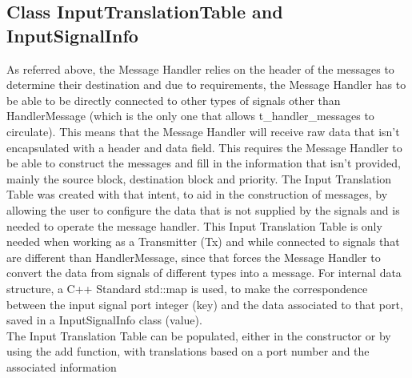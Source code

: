 \begin{refsection}
\subsection{Class InputTranslationTable and InputSignalInfo}
\label{lib:inputtranslationtable}
As referred above, the Message Handler relies on the header of the messages to 
determine their destination and due to requirements, the Message 
Handler has to be able to be directly connected to other types of signals other than 
HandlerMessage (which is the only one that allows t\_handler\_messages to circulate). 
This means that the Message Handler will receive raw data that isn't 
encapsulated with a header and data field. This requires the Message Handler to be 
able to construct the messages and fill in the information that isn't provided, mainly
the source block, destination block and priority. The Input Translation Table  was created
with that intent, to aid in the construction of messages, by 
allowing the user to configure the data that is not supplied by the signals and is 
needed to operate the message handler.
This Input Translation Table is only needed when working as a Transmitter (Tx) and 
while connected to signals that are different than HandlerMessage, since that forces
the Message Handler to convert the data from signals of different types 
into a message.
For internal data structure, a C++ Standard std::map is used, 
to make the correspondence between the input signal port integer (key) and the data
associated to that port, saved in a InputSignalInfo class (value).
\\
The Input Translation Table can be populated, either in the constructor or by using the add 
function, with translations based on a port number and the associated information


\end{refsection}
